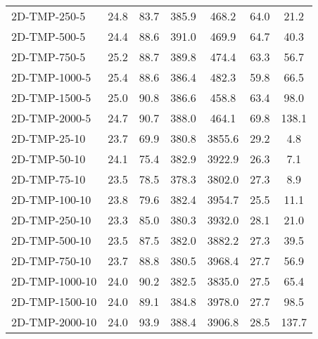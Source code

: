 \documentclass{article}
\begin{document}
\begin{center}
\begin{table}[h]
\begin{tabular}{|l||c|c|c|c|c|c|}
            2D-TMP-250-5                   & 24.8      & 83.7       & 385.9       & 468.2    & 64.0      & 21.2       \\
            2D-TMP-500-5                   & 24.4      & 88.6       & 391.0       & 469.9    & 64.7      & 40.3       \\
            2D-TMP-750-5                   & 25.2      & 88.7       & 389.8       & 474.4    & 63.3      & 56.7       \\
            2D-TMP-1000-5                  & 25.4      & 88.6       & 386.4       & 482.3    & 59.8      & 66.5       \\
            2D-TMP-1500-5                  & 25.0      & 90.8       & 386.6       & 458.8    & 63.4      & 98.0       \\
            2D-TMP-2000-5                  & 24.7      & 90.7       & 388.0       & 464.1    & 69.8      & 138.1      \\
            \hline
            2D-TMP-25-10                   & 23.7      & 69.9       & 380.8       & 3855.6   & 29.2      & 4.8        \\
            2D-TMP-50-10                   & 24.1      & 75.4       & 382.9       & 3922.9   & 26.3      & 7.1        \\
            2D-TMP-75-10                   & 23.5      & 78.5       & 378.3       & 3802.0   & 27.3      & 8.9        \\
            2D-TMP-100-10                  & 23.8      & 79.6       & 382.4       & 3954.7   & 25.5      & 11.1       \\
            2D-TMP-250-10                  & 23.3      & 85.0       & 380.3       & 3932.0   & 28.1      & 21.0       \\
            2D-TMP-500-10                  & 23.5      & 87.5       & 382.0       & 3882.2   & 27.3      & 39.5       \\
            2D-TMP-750-10                  & 23.7      & 88.8       & 380.5       & 3968.4   & 27.7      & 56.9       \\
            2D-TMP-1000-10                 & 24.0      & 90.2       & 382.5       & 3835.0   & 27.5      & 65.4       \\
            2D-TMP-1500-10                 & 24.0      & 89.1       & 384.8       & 3978.0   & 27.7      & 98.5       \\
            2D-TMP-2000-10                 & 24.0      & 93.9       & 388.4       & 3906.8   & 28.5      & 137.7      \\
            \hline

\end{tabular}
\end{table}
\end{center}
\end{document}
